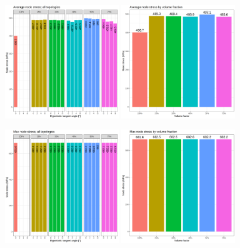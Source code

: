 \documentclass[../main.tex]{subfiles}
\begin{document}
\begin{figure}[h!]
  \centering
  \includegraphics[width=0.45\textwidth]{images/results/plots/femoral/stress/average_stress.png}
  \hfill
  \includegraphics[width=0.45\textwidth]{images/results/plots/femoral/stress/femoral_average_group_stress.png}
  \caption{}
  \label{fig:average_stresses}
\end{figure}

\begin{figure}[h!]
  \centering
  \includegraphics[width=0.45\textwidth]{images/results/plots/femoral/stress/maximum_stress.png}
  \hfill
  \includegraphics[width=0.45\textwidth]{images/results/plots/femoral/stress/femoral_max_group_stress.png}
  \caption{}
  \label{fig:maximum_stresses}
\end{figure}
\end{document}
